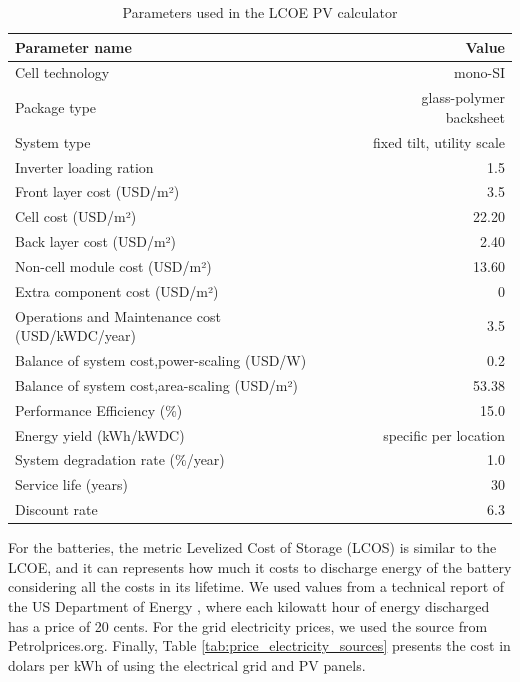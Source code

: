 \begin{table}[H]
  
  \caption{Parameters used in the LCOE PV calculator}\label{tab:parameters_pv_LCOE} \centering

  \begin{tabular}{|l|r|}
    \hline    
    \textbf{Parameter name} &   \textbf{Value} \\
    \hline
    Cell technology & mono-SI  \\
    \hline
    Package type  & glass-polymer backsheet \\
    \hline
    System type  & fixed tilt, utility scale \\
    \hline
    Inverter loading ration  & 1.5 \\
    \hline
    Front layer cost (USD/m²)   &  3.5 \\
    \hline
    Cell  cost (USD/m²)   &  22.20 \\
    \hline
    Back layer cost (USD/m²)   & 2.40 \\
    \hline
    Non-cell module cost (USD/m²)   &  13.60 \\
    \hline
    Extra component cost (USD/m²)   &  0 \\
    \hline
    Operations and Maintenance cost  (USD/kWDC/year)   &  3.5 \\
    \hline  
    Balance of system cost,power-scaling  (USD/W)   &  0.2 \\
    \hline  
    Balance of system cost,area-scaling  (USD/m²)   &  53.38 \\
    \hline  
    Performance Efficiency (\%) & 15.0  \\
    \hline
    Energy yield (kWh/kWDC) & specific per location \\
    \hline
    System degradation rate (\%/year)  & 1.0 \\
    \hline
    Service life (years) & 30 \\
    \hline
    Discount rate & 6.3 \\
    \hline
    

  \end{tabular}  
\end{table}

For the batteries, the metric Levelized Cost of Storage (LCOS) is similar to the LCOE, and it can represents how much it costs to discharge energy of the battery considering all the costs in its lifetime. We used values from a technical report of the US Department of Energy \cite{battery_lcos_2022}, where each kilowatt hour of energy discharged has a price of 20 cents. For the grid electricity prices, we used the source from Petrolprices.org. Finally, Table \ref{tab:price_electricity_sources} presents the cost in dolars per kWh of using the electrical grid and PV panels.


